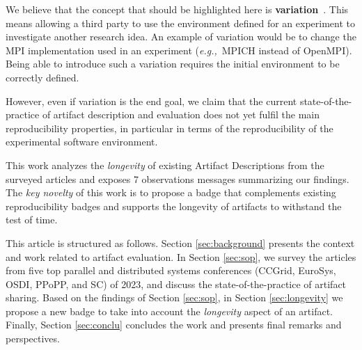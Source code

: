 \documentclass[sigconf,natbib=false]{acmart}
\newcommand{\eg}{\emph{e.g.,}}
\newcommand{\ad}{Artifact Description}
\begin{document}


We believe that the concept that should be highlighted here is \textbf{variation}\ \cite{mercier2018considering, feitelson_repeatability_2015}.
This means allowing a third party to use the environment defined for an experiment to investigate another research idea.
An example of variation would be to change the MPI implementation used in an experiment (\eg\ MPICH instead of OpenMPI).
Being able to introduce such a variation requires the initial environment to be correctly defined.

However, even if variation is the end goal, we claim that the current state-of-the-practice of artifact description and evaluation does not yet fulfil the main reproducibility properties, in particular in terms of the reproducibility of the experimental software environment.

This work analyzes the \emph{longevity} of existing \ad s from the surveyed articles and exposes 7 observations messages summarizing our findings.
The \textit{key novelty} of this work is to propose a badge that complements existing reproducibility badges and supports the longevity of artifacts to withstand the test of time. 

This article is structured as follows.
Section \ref{sec:background} presents the context and work related to artifact evaluation.
In Section \ref{sec:sop}, we survey the articles from five top parallel and distributed systems conferences (CCGrid, EuroSys, OSDI, PPoPP, and SC) of 2023, and discuss the state-of-the-practice of artifact sharing.
Based on the findings of Section \ref{sec:sop}, in Section \ref{sec:longevity} we propose a new badge to take into account the \emph{longevity} aspect of an artifact.
Finally, Section \ref{sec:conclu} concludes the work and presents final remarks and perspectives.
\end{document}
